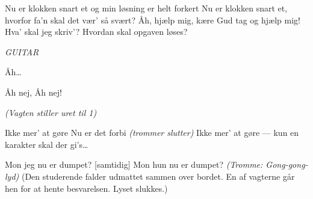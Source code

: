 \documentclass{article}
\begin{document}
\begin{song}
Nu er klokken snart et og min løsning er helt forkert
Nu er klokken snart et, hvorfor fa'n skal det vær' så svært?
Åh, hjælp mig, kære Gud tag og hjælp mig!
Hva' skal jeg skriv'? Hvordan skal opgaven løses?

{\em GUITAR}

 Åh\ldots

 Åh nej, Åh nej!

{\em (Vagten stiller uret til 1)}

Ikke mer' at gøre
Nu er det forbi {\em (trommer slutter)}
Ikke mer' at gøre --- kun en karakter skal der gi's\dots 

Mon jeg nu er dumpet?
[samtidig] Mon hun nu er dumpet?
{\em (Tromme: Gong-gong-lyd)}
\scene
(Den studerende falder udmattet sammen over bordet. En af %
vagterne går hen for at hente besvarelsen. Lyset slukkes.)
\end{song}
\end{document}
